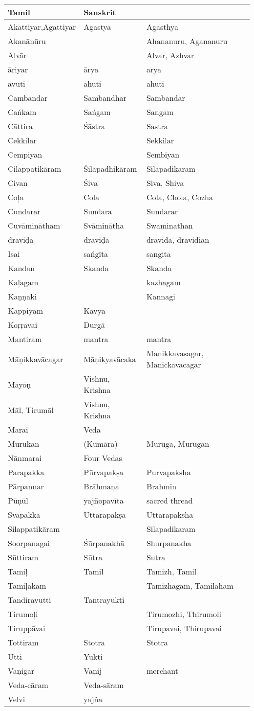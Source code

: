 \begin{longtable}{|m{2.5cm}|m{2.5cm}|>{\raggedright}m{3cm}|}
\hline
\multicolumn{1}{|m{2.5cm}|}{\centering Tamil} & \multicolumn{1}{m{2.5cm}|}{\centering Sanskrit} & \multicolumn{1}{m{3cm}|}{\centering English Equivalents Commonly Used} \\
\hline
Akattiyar,\break  Agattiyar & Agastya & Agasthya \tabularnewline
\hline
Akanānūru &  & Ahananuru, Agananuru \tabularnewline
\hline
Āļvār &  & Alvar, Azhvar \tabularnewline
\hline
āriyar & ārya & arya \tabularnewline
\hline
āvuti & āhuti\index{ahuti@\textit{āhuti}} & ahuti \tabularnewline
\hline
Cambandar & Sambandhar & Sambandar \tabularnewline
\hline
Cańkam & Sańgam & Sangam \tabularnewline
\hline
Cāttira & Śāstra & Sastra \tabularnewline
\hline
Cekkilar &  & Sekkilar \tabularnewline
\hline
Cempiyan &  & Sembiyan \tabularnewline
\hline
Cilappatikāram & Śilapadhikāram & Silapadikaram \tabularnewline
\hline
Civan & Śiva & Siva, Shiva \tabularnewline
\hline
Coļa & Cola & Cola, Chola, Cozha \tabularnewline
\hline
Cundarar & Sundara & Sundarar \tabularnewline
\hline
Cuvāminātham & Svāminātha & Swaminathan \tabularnewline
\hline
drāviḍa & drāviḍa & dravida, dravidian \tabularnewline
\hline
Isai & sańgīta & sangita \tabularnewline
\hline
Kandan & Skanda & Skanda \tabularnewline
\hline
Kaļagam &  & kazhagam \tabularnewline
\hline
Kaṇṇaki &  & Kannagi \tabularnewline
\hline
Kāppiyam & Kāvya &  \tabularnewline
\hline
Koṛṛavai & Durgā &  \tabularnewline
\hline
Mantiram & mantra & mantra \tabularnewline
\hline
Māṇikkavācagar & Māṇikyavācaka & Manikkavasagar, Manickavacagar \tabularnewline
\hline
Māyōṇ & Vishnu, Krishna &  \tabularnewline
\hline
Māl, Tirumāl & Vishnu, Krishna &  \tabularnewline
\hline
Marai & Veda &  \tabularnewline
\hline
Murukan & (Kumāra) & Muruga, Murugan \tabularnewline
\hline
Nānmarai & Four Vedas &  \tabularnewline
\hline
Parapakka & Pūrvapakṣa & Purvapaksha \tabularnewline
\hline
Pārpannar & Brāhmaņa & Brahmin \tabularnewline
\hline
Pūņūl & yajñopavīta & sacred thread \tabularnewline
\hline
Svapakka & Uttarapakṣa & Uttarapaksha \tabularnewline
\hline
Silappatikāram &  & Silapadikaram \tabularnewline
\hline
Soorpanagai & Śūrpanakhā & Shurpanakha \tabularnewline
\hline
Sūttiram & Sūtra & Sutra \tabularnewline
\hline
Tamiļ & Tamil & Tamizh, Tamil \tabularnewline
\hline
Tamiļakam &  & Tamizhagam, Tamilaham \tabularnewline
\hline
Tandiravutti\index{Tandiravutti@\textit{Tandiravutti}} & Tantrayukti\index{Tantrayukti@\textit{Tantrayukti}} &  \tabularnewline
\hline
Tirumoļi &  & Tirumozhi, Thirumoli \tabularnewline
\hline
Tiruppāvai &  & Tirupavai, Thirupavai \tabularnewline
\hline
Tottiram & Stotra & Stotra \tabularnewline
\hline
Utti & Yukti &  \tabularnewline
\hline
Vaṇigar & Vaṇij & merchant \tabularnewline
\hline
Veda-cāram & Veda-sāram &  \tabularnewline
\hline
Velvi & yajña &  \tabularnewline
\hline
\end{longtable}


